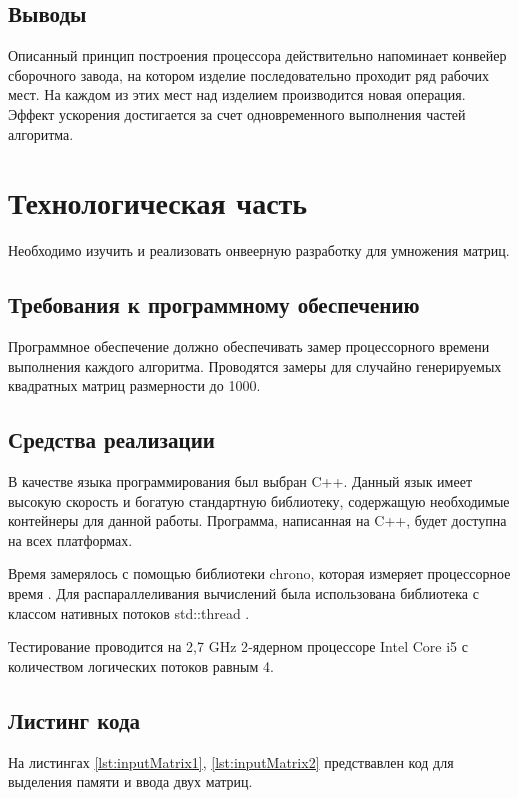 \documentclass[a4paper,12pt]{article}
\begin{document}
\subsection{Выводы}

Описанный принцип построения процессора действительно напоминает конвейер сборочного завода, на котором изделие последовательно проходит ряд рабочих мест. На каждом из этих мест над изделием производится новая операция. Эффект ускорения достигается за счет одновременного выполнения частей алгоритма.

\newpage
\section{Технологическая часть}

Необходимо изучить и реализовать онвеерную разработку для умножения матриц.

\subsection{Требования к программному обеспечению}

Программное обеспечение должно обеспечивать замер процессорного времени выполнения
каждого алгоритма. Проводятся замеры для случайно генерируемых квадратных матриц
размерности до 1000.

\subsection{Средства реализации}

В качестве языка программирования был выбран {\ttfamily C++}.
Данный язык имеет высокую скорость и богатую стандартную библиотеку,
содержащую необходимые контейнеры для данной работы. Программа, написанная на
{\ttfamily C++}, будет доступна на всех платформах.

Время замерялось с помощью библиотеки {\ttfamily chrono}, которая измеряет
процессорное время \cite{chrono}. Для распараллеливания вычислений была
использована библиотека с классом нативных потоков
{\ttfamily std::thread} \cite{thread}.

Тестирование проводится на 2,7 GHz 2‑ядерном процессоре Intel Core i5 с количеством логических потоков равным 4.

\subsection{Листинг кода}

На листингах \ref{lst:inputMatrix1}, \ref{lst:inputMatrix2} предствавлен код для
выделения памяти и ввода двух матриц.
\end{document}
